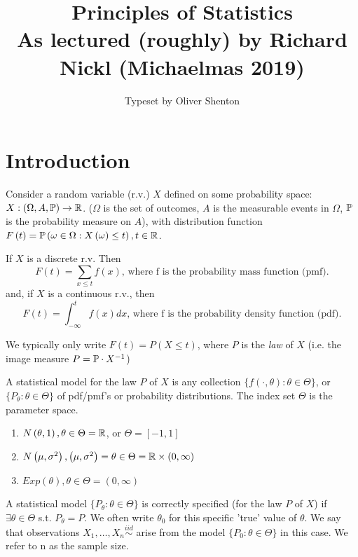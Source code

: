 \documentclass[a4paper]{article}
\title{Principles of Statistics \\ \large{As lectured (roughly) by Richard Nickl (Michaelmas 2019)}}
\date{}
\author{Typeset by Oliver Shenton}
\begin{document}
	
\maketitle

\section{Introduction}

Consider a random variable (r.v.) $X$ defined on some probability space: $ X: (\Omega, A,\P) \to \R$. ($\Omega$ is the set of outcomes, $A$ is the measurable events in $\Omega$, $\P$ is the probability measure on $A $), with distribution function $F\left( t \right) = \P\left( \omega \in  \Omega : X\left( \omega \right) \le  t\right), t \in \R$.

If $X$ is a discrete r.v. Then
\[
	F(t) = \sum_{x\le t} f(x) \textrm{, where f is the probability mass function (pmf)}
.\] 
and, if $X$ is a continuous r.v., then
\[
	F(t) = \int_{- \infty}^{t} f(x) dx \textrm{, where f is the probability density function (pdf)}
.\] 

We typically only write $F(t) = P\left( X \le  t\right)$, where $P$ is the \textit{law} of  $X$ (i.e. the image measure  $P = \P \cdot X^{-1} $)

\begin{defn}
	A statistical model for the law $P$ of $X$ is any collection $\{ f\left(\cdot, \theta \right): \theta \in \Theta \} $, or $\{ P_{\theta} : \theta \in \Theta\} $ of pdf/pmf's or probability distributions. The index set $\Theta$ is the parameter space.
\end{defn}

\begin{eg}
	\begin{enumerate}
		\item $N\left( \theta, 1 \right), \theta \in \Theta = \R $, or $\Theta = \left[ -1, 1 \right] $

		\item $N\left( \mu, \sigma ^2 \right), \left( \mu, \sigma ^2 \right) = \theta \in  \Theta = \R \times \left( 0, \infty \right)  $
	
		\item $Exp\left( \theta \right) , \theta \in \Theta = \left( 0, \infty \right)  $
	\end{enumerate}
\end{eg}

\begin{defn}
	A statistical model $\{ P_{\theta} : \theta \in \Theta \} $ is correctly specified (for the law $P$ of $X$) if $\exists \theta \in \Theta$ s.t. $P_{\theta} = P$. We often write $\theta_{0}$ for this specific 'true' value of $\theta$. We say that observations $X_{1}, \ldots, X_{n} \stackrel{iid}{\sim} $ arise from the model $\{ P_{0} : \theta \in \Theta\} $ in this case. We refer to n as the sample size.
\end{defn}
\end{document}
